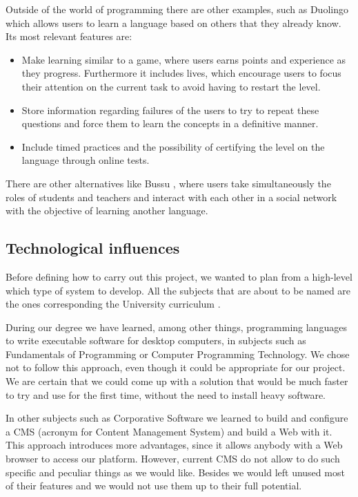 Outside of the world of programming there are other examples, such as Duolingo \cite{duolingo} which allows users to learn a language based on others that they already know. Its most relevant features are:

\begin{itemize}
\item
Make learning similar to a game, where users earns points and experience as they progress. Furthermore it includes lives, which encourage users to focus their attention on the current task to avoid having to restart the level.

\item
Store information regarding failures of the users to try to repeat these questions and force them to learn the concepts in a definitive manner.

\item
Include timed practices and the possibility of certifying the level on the language through online tests.
\end{itemize}

There are other alternatives like Bussu \cite{bussu}, where users take simultaneously the roles of students and teachers and interact with each other in a social network with the objective of learning another language.

\subsection{Technological influences\label{subsec:influences}}
Before defining how to carry out this project, we wanted to plan from a high-level which type of system to develop. All the subjects that are about to be named are the ones corresponding the University curriculum \cite{plan, boe}. 

During our degree we have learned, among other things, programming languages to write executable software for desktop computers, in subjects such as Fundamentals of Programming or Computer Programming Technology. We chose not to follow this approach, even though it could be appropriate for our project. We are certain that we could come up with a solution that would be much faster to try and use for the first time, without the need to install heavy software.

In other subjects such as Corporative Software we learned to build and configure a CMS (acronym for Content Management System) and build a Web with it. This approach introduces more advantages, since it allows anybody with a Web browser to access our platform. However, current CMS do not allow to do such specific and peculiar things as we would like. Besides we would left unused most of their features and we would not use them up to their full potential.

